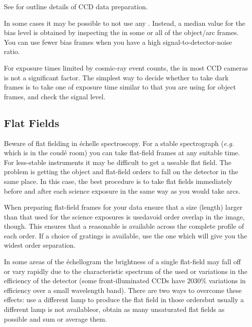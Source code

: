 See \sgspec{\S \ref{se_image_preparation}}
{}
for outline details of CCD data preparation.

In some cases it may be possible to not use any
.  Instead,
a median value for the bias level is obtained by inspecting the
 in some or all of the object/arc
frames.
You can use fewer bias frames when you have a high signal-to-detector-noise
ratio.

For exposure times limited by cosmic-ray event counts, the
in most CCD cameras is not a significant factor.  The simplest way to
decide whether to take dark frames is to take one of exposure time
similar to that you are using for object frames, and check the signal level.


\subsection{\label{se_flat_beware}Flat Fields}

Beware of flat fielding in \'{e}chelle spectroscopy.  For a stable
spectrograph ({\em{e.g.}}  which is in the
 coud\'{e} room)
you can take flat-field frames at any suitable time.  For less-stable
instruments it may be difficult to get a useable flat field.
The problem is getting the object and flat-field orders to fall on the
detector in the same place.
In this case, the best procedure is to take flat fields immediately
before and after each science exposure in the same way as you would
take arcs.

When preparing flat-field frames for your data ensure that a
 size (length)
larger than that used for the science exposures is used\sgspec{---}{ - }avoid
order overlap in the image, though.  This ensures that a reasonable
 is available across the complete
profile of each order.  If a choice of gratings is available, use the
one which will give you the widest order separation.

In some areas of the \'{e}chellogram the brightness of a single
flat-field may fall off or vary rapidly due to the characteristic
spectrum of the 
used or variations in the efficiency of the
detector (some front-illuminated CCDs have 20\sgspec{--}{-}30\%
variations in efficiency over a small wavelength band).
There are two ways to overcome these effects: use a different lamp
to produce the flat field in those orders\sgspec{---}{ - }but usually a
different lamp is not available\sgspec{---}{ - }or, obtain as many
unsaturated flat fields as possible and sum or average them.

